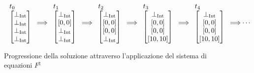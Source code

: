 \begin{figure}[H]
    \centering
\[
\arraycolsep=1.1pt
\begin{array}{ccccccccccc}
    \begin{tabular}{l}
    $
    t_0
    $ \\
    $
    \begin{bmatrix}
       \perp_{\textrm{Int}} \\
       \perp_{\textrm{Int}} \\
       \perp_{\textrm{Int}} \\
       \perp_{\textrm{Int}}
    \end{bmatrix}
    $
    \end{tabular}
    &
    \Longrightarrow
    &
    \begin{tabular}{l}
    $t_1$ \\
    $
    \begin{bmatrix}
       \perp_{\textrm{Int}} \\
       [0, 0] \\
       \perp_{\textrm{Int}} \\
       \perp_{\textrm{Int}}
    \end{bmatrix}
    $
    \end{tabular}
    &
    \Longrightarrow
    &
    \begin{tabular}{l}
    $t_2$ \\
    $
    \begin{bmatrix}
       \perp_{\textrm{Int}} \\
       [0, 0] \\
       [0, 0] \\
       \perp_{\textrm{Int}}
    \end{bmatrix}
    $
    \end{tabular}
    &
    \Longrightarrow
    &
    \begin{tabular}{l}
    $t_3$ \\
    $
    \begin{bmatrix}
       \perp_{\textrm{Int}} \\
       [0, 0] \\
       [0, 0] \\
       [10, 10]
    \end{bmatrix}
    $
    \end{tabular}
    &
    \Longrightarrow
    &
    \begin{tabular}{l}
    $t_4$ \\
    $
    \begin{bmatrix}
       \perp_{\textrm{Int}} \\
       [0, 0] \\
       [0, 0] \\
       [10, 10]
    \end{bmatrix}
    $
    \end{tabular}
    &
    \Longrightarrow
    &
    \cdots
\end{array}
\]
    \caption{Progressione della soluzione attraverso l'applicazione del sistema di equazioni \(F^{\natural}\)}
    \label{fig:progression_abstr}
\end{figure}

